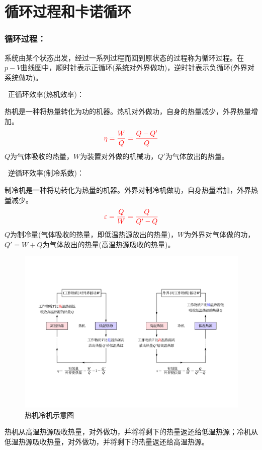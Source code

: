 \documentclass[zihao=5,UTF8]{report}
\begin{document}
\section{循环过程和卡诺循环}
\subsubsection{循环过程：}
系统由某个状态出发，经过一系列过程而回到原状态的过程称为循环过程。在$p-V$曲线图中，顺时针表示正循环(系统对外界做功)，逆时针表示负循环(外界对系统做功)。\par
{}\ 正循环效率(热机效率)：\par
热机是一种将热量转化为功的机器。热机对外做功，自身的热量减少，外界热量增加。
\begin{equation}
    {\color{red}\eta = \frac{W}{Q} = \frac{Q - Q'}{Q}}
\end{equation}
{\color{gray}\small $Q$为气体吸收的热量，$W$为装置对外做的机械功，$Q'$为气体放出的热量。}\par
{}\ 逆循环效率(制冷系数)：\par
制冷机是一种将功转化为热量的机器。外界对制冷机做功，自身热量增加，外界热量减少。
\begin{equation}
    {\color{red}\varepsilon =\frac{Q}{W} = \frac{Q}{Q' - Q}}
\end{equation}
{\color{gray}\small $Q$为制冷量(气体吸收的热量，即低温热源放出的热量)，$W$为外界对气体做的功，$Q'= W+Q$为气体放出的热量(高温热源吸收的热量)。}
\begin{figure}[H]
    \centering
    \includegraphics[width = \textwidth]{pic/热机冷机示意图.pdf}
    \caption{热机冷机示意图}
\end{figure}
热机从高温热源吸收热量，对外做功，并将将剩下的热量返还给低温热源；冷机从低温热源吸收热量，对外做功，并将剩下的热量返还给高温热源。
\end{document}
